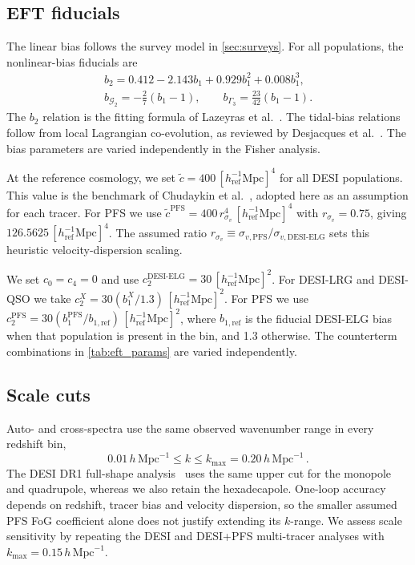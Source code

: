 \documentclass[a4paper,11pt]{article}
\newcommand{\revchange}[1]{{\color{RevisionColor}#1}}
\def\be{\begin{equation}}
\def\ee{\end{equation}}
\def\iMpch{\,h\,\mathrm{Mpc}^{-1}}
\def\kmax{k_{\mathrm{max}}}
\newcommand{\G}{\mathcal{G}}
\newcommand{\PFS}{\mathrm{PFS}}
\newcommand{\ctilde}{\tilde{c}}
\newcommand{\rsv}{r_{\sigma_v}}
\begin{document}
\subsection{\texorpdfstring{\revchange{EFT fiducials}}{EFT fiducials}}
\label{sec:eft_fiducials}

\revchange{The linear bias follows the survey
model in \cref{sec:surveys}. For all populations, the nonlinear-bias
fiducials are
\[
\begin{gathered}
b_2=0.412-2.143b_1+0.929b_1^2+0.008b_1^3,\\
b_{\G_2}=-\frac{2}{7}(b_1-1),\qquad
b_{\Gamma_3}=\frac{23}{42}(b_1-1).
\end{gathered}
\]
The $b_2$ relation is the fitting formula of
Lazeyras et al.~\cite{Lazeyras:2015lgp}. The tidal-bias relations follow
from local Lagrangian co-evolution, as reviewed by
Desjacques et al.~\cite{Desjacques:2016bnm}. The bias parameters are
varied independently in the Fisher analysis.

At the reference cosmology, we set
$\ctilde=400\,[h_{\mathrm{ref}}^{-1}\mathrm{Mpc}]^4$ for all DESI
populations. This value is the benchmark of
Chudaykin et al.~\cite{Chudaykin:2025aux}, adopted here as an
assumption for each tracer. For PFS we use
$\ctilde^{\PFS}=400\,\rsv^4\,[h_{\mathrm{ref}}^{-1}\mathrm{Mpc}]^4$
with $\rsv=0.75$, giving $126.5625\,[h_{\mathrm{ref}}^{-1}\mathrm{Mpc}]^4$.
The assumed ratio $\rsv\equiv\sigma_{v,\PFS}/\sigma_{v,\mathrm{DESI\text{-}ELG}}$
sets this heuristic velocity-dispersion scaling.

We set $c_0=c_4=0$ and use
$c_2^{\mathrm{DESI\text{-}ELG}}=30\,[h_{\mathrm{ref}}^{-1}\mathrm{Mpc}]^2$.
For DESI-LRG and DESI-QSO we take
$c_2^X=30(b_1^X/1.3)\,[h_{\mathrm{ref}}^{-1}\mathrm{Mpc}]^2$.
For PFS we use
$c_2^{\PFS}=30(b_1^{\PFS}/b_{1,\mathrm{ref}})\,[h_{\mathrm{ref}}^{-1}\mathrm{Mpc}]^2$,
where $b_{1,\mathrm{ref}}$ is the fiducial DESI-ELG bias when that
population is present in the bin, and 1.3 otherwise. The
counterterm combinations in \cref{tab:eft_params} are varied independently.}


\subsection{\texorpdfstring{\revchange{Scale cuts}}{Scale cuts}}
\label{sec:asymmetric_kmax}

\revchange{Auto- and cross-spectra use the same observed wavenumber range
in every redshift bin,
\be
\label{eqn:kmax_asym}
0.01\iMpch \leq k \leq \kmax=0.20\iMpch\,.
\ee
The DESI DR1 full-shape analysis~\cite{DESI:2024jxi} uses the same upper cut
for the monopole and quadrupole, whereas we also retain the hexadecapole. One-loop accuracy depends on
redshift, tracer bias and velocity dispersion, so the smaller
assumed PFS FoG coefficient alone does not justify extending
its $k$-range. We assess scale sensitivity by repeating the DESI
and DESI+PFS multi-tracer analyses with $\kmax=0.15\iMpch$.}
\end{document}
